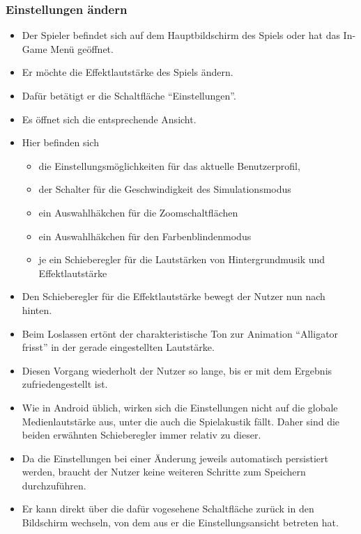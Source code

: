 \subsubsection{Einstellungen ändern}
\begin{itemize}
\item Der Spieler befindet sich auf dem Hauptbildschirm des Spiels oder hat das In-Game Menü 
geöffnet.
\item Er möchte die Effektlautstärke des Spiels ändern.
\item Dafür betätigt er die Schaltfläche "`Einstellungen"'.
\item Es öffnet sich die entsprechende Ansicht.
\item Hier befinden sich
	\begin{itemize}
	\item die Einstellungsmöglichkeiten für das aktuelle Benutzerprofil, 
	\item der Schalter für die Geschwindigkeit des Simulationsmodus
	\item ein Auswahlhäkchen für die Zoomschaltflächen
	\item ein Auswahlhäkchen für den Farbenblindenmodus
	\item je ein Schieberegler für die Lautstärken von Hintergrundmusik und Effektlautstärke
	\end{itemize}
\item Den Schieberegler für die Effektlautstärke bewegt der Nutzer nun nach hinten.
\item Beim Loslassen ertönt der charakteristische Ton zur Animation "`Alligator frisst"' in der
gerade eingestellten Lautstärke.
\item Diesen Vorgang wiederholt der Nutzer so lange, bis er mit dem Ergebnis zufriedengestellt ist.
\item Wie in Android üblich, wirken sich die Einstellungen nicht auf die globale Medienlautstärke
aus, unter die auch die Spielakustik fällt. Daher sind die beiden erwähnten Schieberegler immer relativ zu dieser. 
\item Da die Einstellungen bei einer Änderung jeweils automatisch persistiert werden, braucht der
Nutzer keine weiteren Schritte zum Speichern durchzuführen.
\item Er kann direkt über die dafür vogesehene Schaltfläche zurück in den Bildschirm
wechseln, von dem aus er die Einstellungsansicht betreten hat.
\end{itemize}
